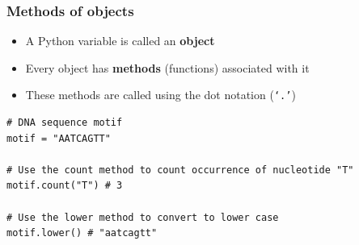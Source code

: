 \documentclass[xcolor=table]{beamer}
\begin{document}
\begin{frame}[fragile]
\frametitle{Methods of objects}

\begin{itemize}\addtolength{\itemsep}{0.5\baselineskip}
	\item A Python variable is called an \textbf{object}
	\item Every object has \textbf{methods} (functions) associated with it
	\item These methods are called using the dot notation (\texttt{`.'})
\end{itemize}
\begin{lstlisting}[style=python]
# DNA sequence motif
motif = "AATCAGTT"

# Use the count method to count occurrence of nucleotide "T" 
motif.count("T") # 3

# Use the lower method to convert to lower case
motif.lower() # "aatcagtt"
\end{lstlisting} 

\end{frame}

\end{document}
